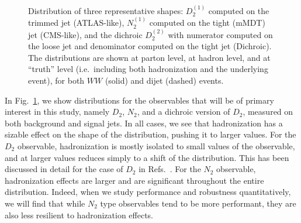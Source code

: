 \documentclass[11pt]{cernrep}
\begin{document}
\begin{figure}
  \caption{Distribution of three representative shapes: $D_2^{(1)}$
    computed on the trimmed jet (ATLAS-like), $N_2^{(1)}$ computed on
    the tight (mMDT) jet (CMS-like), and the dichroic $D_2^{(2)}$ with numerator
    computed on the loose jet and denominator computed on the tight
    jet (Dichroic). The distributions are shown at parton level, at hadron level,
    and at ``truth'' level (i.e.\ including both hadronization and the
    underlying event), for both $WW$ (solid) and dijet (dashed)
    events.}\label{jetsub_2prong_fig:shape-distribution}
\end{figure}

In Fig.~\ref{jetsub_2prong_fig:shape-distribution}, we show distributions for the observables that will be of primary interest in this study, namely $D_2$, $N_2$, and a dichroic version of $D_2$, measured on both background and signal jets.
%
In all cases, we see that hadronization has a sizable effect on the shape of the distribution, pushing it to larger values.
%
For the $D_2$ observable, hadronization is mostly isolated to small values of the observable, and at larger values reduces simply to a shift of the distribution.
%
This has been discussed in detail for the case of $D_2$ in Refs.~\cite{Larkoski:2015kga,Larkoski:2017cqq,Larkoski:2017iuy}.
%
For the $N_2$ observable, hadronization effects are larger and are significant throughout the entire distribution.
%
Indeed, when we study performance and robustness quantitatively, we will find that while $N_2$ type observables tend to be more performant, they are also less resilient to hadronization effects. 
\end{document}
